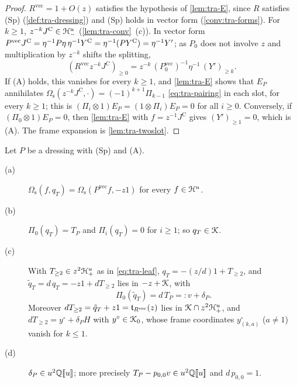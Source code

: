 \begin{proof}
$R^{\mathrm{vec}} = 1+O(z)$ satisfies the hypothesis of \cref{lem:tra-E}, since $R$ satisfies (Sp) (\cref{def:tra-dressing}) and (Sp) holds in vector form (\cref{conv:tra-forms}). For $k\geq 1$, $z^{-k}J^{\mathrm C}\in\mathcal{H}^u_-$ (\cref{lem:tra-conv}~(c)). In vector form $P^{\mathrm{vec}}J^{\mathrm C} = \eta^{-1}P\eta\,\eta^{-1}Y^{\mathrm{C}} = \eta^{-1}(PY^{\mathrm{C}}) = \eta^{-1}Y'$; as $P_0$ does not involve $z$ and multiplication by $z^{-k}$ shifts the splitting,
\[
(R^{\mathrm{vec}}z^{-k}J^{\mathrm C})_{\geq 0} = z^{-k}\,(P_0^{\mathrm{vec}})^{-1}\eta^{-1}\,(Y')_{\geq k} .
\]
If (A) holds, this vanishes for every $k\geq 1$, and \cref{lem:tra-E} shows that $E_P$ annihilates $\Omega_{\mathrm s}(z^{-k}J^{\mathrm C},\cdot) = (-1)^{k+1}\Pi_{k-1}$ \eqref{eq:tra-pairing} in each slot, for every $k\geq 1$; this is $(\Pi_i\otimes 1)E_P = (1\otimes\Pi_i)E_P = 0$ for all $i\geq 0$. Conversely, if $(\Pi_0\otimes 1)E_P = 0$, then \cref{lem:tra-E} with $f = z^{-1}J^{\mathrm C}$ gives $(Y')_{\geq 1} = 0$, which is (A). The frame expansion is \cref{lem:tra-twoslot}.
\end{proof}

\begin{lem}
\label{lem:tra-T}
Let $P$ be a dressing with (Sp) and (A).
\begin{description}
\item[(a)] $\Omega_{\mathrm s}(f,q_T) = \Omega_{\mathrm s}(P^{\mathrm{vec}}f,-z1)$ for every $f\in\mathcal{H}^u$.
\item[(b)] $\Pi_0(q_T) = T_P$ and $\Pi_i(q_T) = 0$ for $i\geq 1$; so $q_T\in\mathcal{K}$.
\item[(c)] With $T_{\geq 2}\in z^2\mathcal{H}^u_+$ as in \eqref{eq:tra-leaf}, $q_T = -(z/d)1+T_{\geq 2}$, and $\tilde q_T = d\,q_T = -z1+dT_{\geq 2}$ lies in $-z+\mathcal{K}$, with
\[
\Pi_0(\tilde q_T) = d\,T_P =: v+\delta_P .
\]
Moreover $dT_{\geq 2} = \tilde q_T+z1 = \mathfrak{t}_{R^{\mathrm{vec}}}(z)$ lies in $\mathcal{K}\cap z^2\mathcal{H}^u_+$, and $dT_{\geq 2} = y^\circ+\delta_PH$ with $y^\circ\in\mathcal{K}_{0}$, whose frame coordinates $y^\circ_{(k,a)}$ ($a\neq 1$) vanish for $k\leq 1$.
\item[(d)] $\delta_P\in u^2\mathbb{Q}[\![ u ]\!]$; more precisely $T_P-p_{0,0}v\in u^2\mathbb{Q}[\![ u ]\!]$ and $d\,p_{0,0} = 1$.
\end{description}
\end{lem}

